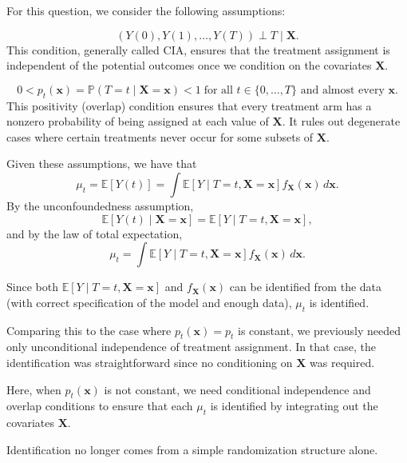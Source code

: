 \documentclass{article}
\begin{document}
For this question, we consider the following assumptions:

\[
(Y(0), Y(1), \dots, Y(T)) \perp T \mid \mathbf{X}.
\]
This condition, generally called CIA, ensures that the treatment assignment is independent of the potential outcomes once we condition on the covariates \(\mathbf{X}\).

\[
0 < p_t(\mathbf{x}) = \mathbb{P}(T=t \mid \mathbf{X}=\mathbf{x}) < 1 \; \text{for all } t \in \{0,\dots,T\} \text{ and almost every } \mathbf{x}.
\]
This positivity (overlap) condition ensures that every treatment arm has a nonzero probability of being assigned at each value of \(\mathbf{X}\). It rules out degenerate cases where certain treatments never occur for some subsets of \(\mathbf{X}\).

Given these assumptions, we have that
\[
\mu_t = \mathbb{E}[Y(t)] = \int \mathbb{E}[Y \mid T=t, \mathbf{X}=\mathbf{x}] f_{\mathbf{X}}(\mathbf{x}) \, d\mathbf{x}.
\]
By the unconfoundedness assumption,
\[
\mathbb{E}[Y(t) \mid \mathbf{X}=\mathbf{x}] = \mathbb{E}[Y \mid T=t, \mathbf{X}=\mathbf{x}],
\]
and by the law of total expectation,
\[
\mu_t = \int \mathbb{E}[Y \mid T=t, \mathbf{X}=\mathbf{x}] f_{\mathbf{X}}(\mathbf{x}) \, d\mathbf{x}.
\]

Since both \(\mathbb{E}[Y \mid T=t, \mathbf{X}=\mathbf{x}]\) and \(f_{\mathbf{X}}(\mathbf{x})\) can be identified from the data (with correct specification of the model and enough data), \(\mu_t\) is identified.

Comparing this to the case where \(p_t(\mathbf{x})=p_t\) is constant, we previously needed only unconditional independence of treatment assignment. In that case, the identification was straightforward since no conditioning on \(\mathbf{X}\) was required.

Here, when \(p_t(\mathbf{x})\) is not constant, we need conditional independence and overlap conditions to ensure that each \(\mu_t\) is identified by integrating out the covariates \(\mathbf{X}\).

Identification no longer comes from a simple randomization structure alone.
  
\end{document}
